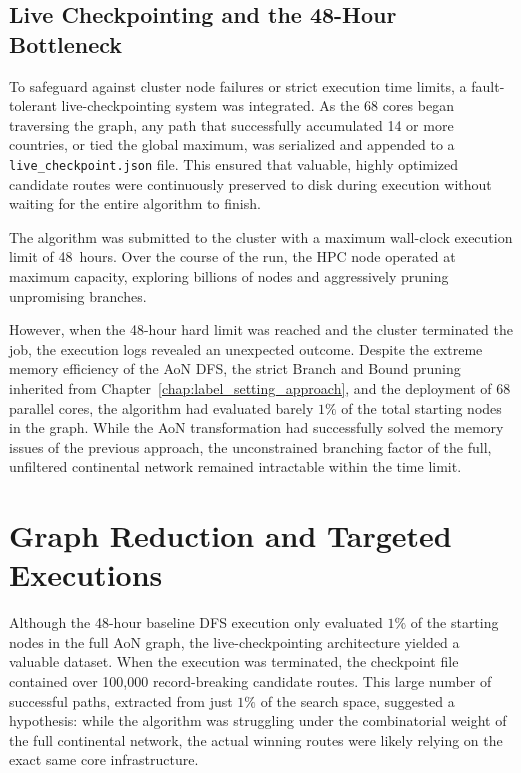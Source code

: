 \subsection{Live Checkpointing and the 48-Hour Bottleneck}
\label{subsec:checkpointing_48h}

To safeguard against cluster node failures or strict execution time limits, a fault-tolerant live-checkpointing system was integrated. As the 68 cores began traversing the graph, any path that successfully accumulated 14 or more countries, or tied the global maximum, was serialized and appended to a \texttt{live\_checkpoint.json} file. This ensured that valuable, highly optimized candidate routes were continuously preserved to disk during execution without waiting for the entire algorithm to finish.

\medskip

The algorithm was submitted to the cluster with a maximum wall-clock execution limit of 48~hours. Over the course of the run, the HPC node operated at maximum capacity, exploring billions of nodes and aggressively pruning unpromising branches.

\medskip

However, when the 48-hour hard limit was reached and the cluster terminated the job, the execution logs revealed an unexpected outcome. Despite the extreme memory efficiency of the AoN DFS, the strict Branch and Bound pruning inherited from Chapter~\ref{chap:label_setting_approach}, and the deployment of 68 parallel cores, the algorithm had evaluated barely $1\%$ of the total starting nodes in the graph. While the AoN transformation had successfully solved the memory issues of the previous approach, the unconstrained branching factor of the full, unfiltered continental network remained intractable within the time limit.

\section{Graph Reduction and Targeted Executions}
\label{sec:graph_reduction_targeted}

Although the 48-hour baseline DFS execution only evaluated $1\%$ of the starting nodes in the full AoN graph, the live-checkpointing architecture yielded a valuable dataset. When the execution was terminated, the checkpoint file contained over 100,000 record-breaking candidate routes. This large number of successful paths, extracted from just $1\%$ of the search space, suggested a hypothesis: while the algorithm was struggling under the combinatorial weight of the full continental network, the actual winning routes were likely relying on the exact same core infrastructure.

